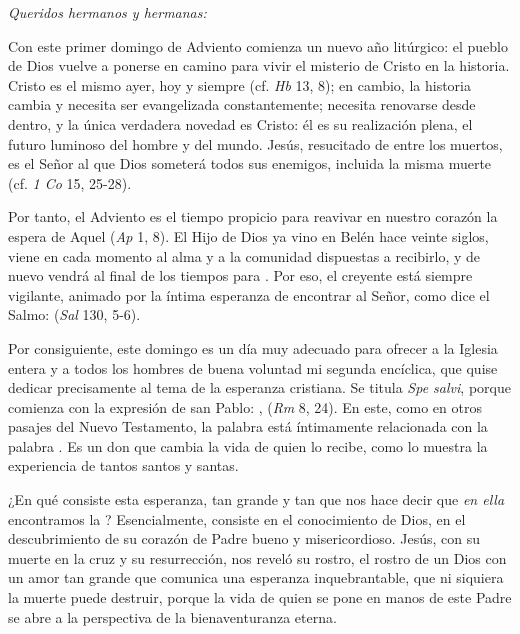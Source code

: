 			
			\begin{body} 
				\emph{Queridos hermanos y hermanas:} 
				
				Con este primer domingo de Adviento comienza un nuevo año litúrgico: el pueblo de Dios vuelve a ponerse en camino para vivir el misterio de Cristo en la historia. Cristo es el mismo ayer, hoy y siempre (cf. \emph{Hb} 13, 8); en cambio, la historia cambia y necesita ser evangelizada constantemente; necesita renovarse desde dentro, y la única verdadera novedad es Cristo: él es su realización plena, el futuro luminoso del hombre y del mundo. Jesús, resucitado de entre los muertos, es el Señor al que Dios someterá todos sus enemigos, incluida la misma muerte (cf. \emph{1 Co} 15, 25-28). 
				
				Por tanto, el Adviento es el tiempo propicio para reavivar en nuestro corazón la espera de Aquel  (\emph{Ap} 1, 8). El Hijo de Dios ya vino en Belén hace veinte siglos, viene en cada momento al alma y a la comunidad dispuestas a recibirlo, y de nuevo vendrá al final de los tiempos para . Por eso, el creyente está siempre vigilante, animado por la íntima esperanza de encontrar al Señor, como dice el Salmo:  (\emph{Sal} 130, 5-6). 
				
				Por consiguiente, este domingo es un día muy adecuado para ofrecer a la Iglesia entera y a todos los hombres de buena voluntad mi segunda encíclica, que quise dedicar precisamente al tema de la esperanza cristiana. Se titula \emph{Spe salvi}, porque comienza con la expresión de san Pablo: \emph{},  (\emph{Rm} 8, 24). En este, como en otros pasajes del Nuevo Testamento, la palabra  está íntimamente relacionada con la palabra . Es un don que cambia la vida de quien lo recibe, como lo muestra la experiencia de tantos santos y santas. 
				
				¿En qué consiste esta esperanza, tan grande y tan  que nos hace decir que \emph{en ella} encontramos la ? Esencialmente, consiste en el conocimiento de Dios, en el descubrimiento de su corazón de Padre bueno y misericordioso. Jesús, con su muerte en la cruz y su resurrección, nos reveló su rostro, el rostro de un Dios con un amor tan grande que comunica una esperanza inquebrantable, que ni siquiera la muerte puede destruir, porque la vida de quien se pone en manos de este Padre se abre a la perspectiva de la bienaventuranza eterna. 
				

\end{body}
